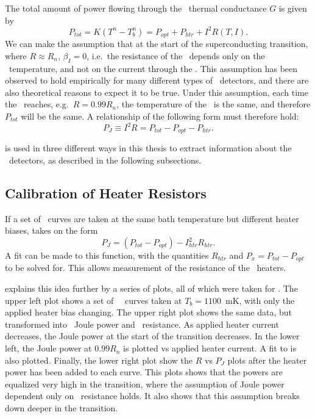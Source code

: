 The total amount of power flowing through the \TES\ thermal conductance $G$ is given by
\begin{equation}\label{eqn:ch3-tes-ptot}
P_{tot} = K(T^n - T_b^n) = P_{opt} + P_{htr} + I^2 R(T,I).
\end{equation}
We can make the assumption that at the start of the superconducting transition, where $R \approx R_n$, $\beta_I = 0$, i.e.\ the resistance of the \TES\ depends only on the \TES\ temperature, and not on the current through the \TES.
This assumption has been observed to hold empirically for many different types of \TES\ detectors, and there are also theoretical reasons to expect it to be true\cite{xxx ref from doug}.
Under this assumption, each time the \TES\ reaches, e.g.\ $R = 0.99R_n$, the temperature of the \TES\ is the same, and therefore $P_{tot}$ will be the same.
A relationship of the following form must therefore hold:
\begin{equation}\label{eqn:ch3-tes-99Rn}
P_{J} \equiv I^2 R = P_{tot} - P_{opt} - P_{htr}.
\end{equation}

 is used in three different ways in this thesis to extract information about the \TES\ detectors, as described in the following subsections.

\subsection{Calibration of Heater Resistors}

If a set of \IV\ curves are taken at the same bath temperature but different heater biases,  takes on the form
\begin{equation}\label{eqn:ch3-rhtr-fit}
P_J = (P_{tot} - P_{opt}) - I_{htr}^2 R_{htr}.
\end{equation}
A fit can be made to this function, with the quantities $R_{htr}$ and $P_x = P_{tot} - P_{opt}$ to be solved for.
This allows measurement of the resistance of the \TES\ heaters.

 explains this idea further by a series of plots, all of which were taken for .
The upper left plot shows a set of \TES\ \IV\ curves taken at $T_b = 1100$~mK, with only the applied heater bias changing.
The upper right plot shows the same data, but transformed into \TES\ Joule power and \TES\ resistance.
As applied heater current decreases, the Joule power at the start of the transition decreases.
In the lower left, the Joule power at $0.99R_{n}$ is plotted vs applied heater current.
A fit to  is also plotted.
Finally, the lower right plot show the $R$ vs $P_J$ plots after the heater power has been added to each curve.
This plots shows that the powers are equalized very high in the transition, where the assumption of Joule power dependent only on \TES\ resistance holds.
It also shows that this assumption breaks down deeper in the transition.

